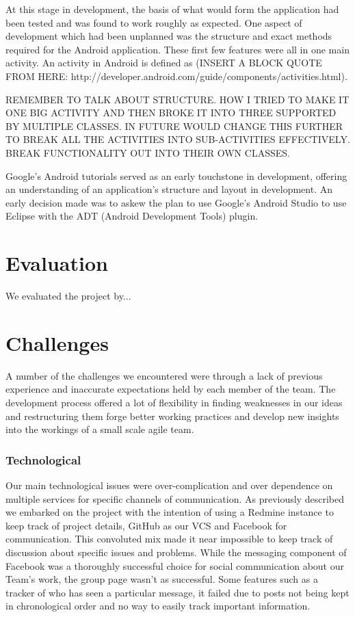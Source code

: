 \documentclass{l3proj}
\begin{document}
At this stage in development, the basis of what would form the application had
been tested and was found to work roughly as expected. One aspect of development
which had been unplanned was the structure and exact methods required for the
Android application. These first few features were all in one main activity. An
activity in Android is defined as (INSERT A BLOCK QUOTE FROM HERE:
http://developer.android.com/guide/components/activities.html).

REMEMBER TO TALK ABOUT STRUCTURE. HOW I TRIED TO MAKE IT ONE BIG ACTIVITY AND
THEN BROKE IT INTO THREE SUPPORTED BY MULTIPLE CLASSES. IN FUTURE WOULD CHANGE
THIS FURTHER TO BREAK ALL THE ACTIVITIES INTO SUB-ACTIVITIES EFFECTIVELY. BREAK
FUNCTIONALITY OUT INTO THEIR OWN CLASSES.

Google's Android tutorials served as an early touchstone in development,
offering an understanding of an application's structure and layout in
development. An early decision made was to askew the plan to use Google's
Android Studio to use Eclipse with the ADT (Android Development Tools) plugin.

\chapter{Evaluation}

We evaluated the project by...

\chapter{Challenges}
\label{Challenges}

A number of the challenges we encountered were through a lack of previous
experience and inaccurate expectations held by each member of the team. The
development process offered a lot of flexibility in finding weaknesses in our
ideas and restructuring them forge better working practices and develop new
insights into the workings of a small scale agile team.

\subsection{Technological}

Our main technological issues were over-complication
and over dependence on multiple services for specific channels of communication.
As previously described we embarked on the project with the intention of using a
Redmine instance to keep track of project details, GitHub as our VCS and
Facebook for communication. This convoluted mix made it near impossible to keep
track of discussion about specific issues and problems. While the messaging
component of Facebook was a thoroughly successful choice for social
communication about our Team's work, the group page wasn't as successful. Some
features such as a tracker of who has seen a particular message, it failed due
to posts not being kept in chronological order and no way to easily track
important information.
\end{document}

